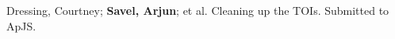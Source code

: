 \item[{\color{numcolor}\scriptsize1}] Dressing, Courtney; \textbf{Savel, Arjun}; et al. Cleaning up the TOIs. Submitted to ApJS.